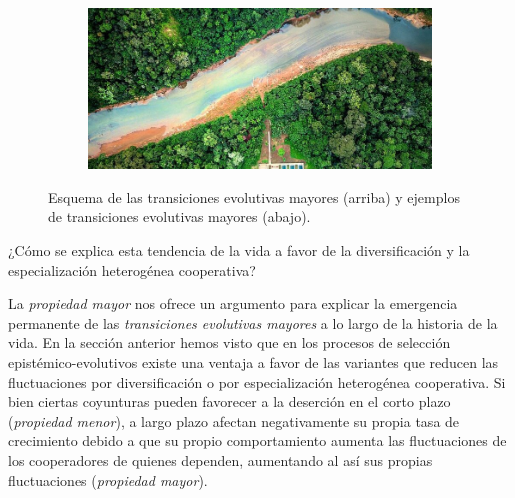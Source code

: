 \documentclass[a4paper,11pt]{book}
\theoremstyle{definition}
\newif\ifen
\newif\ifes
\newcommand{\En}[1]{\ifen#1\fi}
\newcommand{\Es}[1]{\ifes#1\fi}
\begin{document}
\begin{figure}[ht!]
\begin{subfigure}[b]{0.235\textwidth}
 \includegraphics[width=\linewidth]{static/tsimane2.jpg}
  \caption*{\En{Ecosystems}}
 \end{subfigure}
 \caption{
Esquema de las transiciones evolutivas mayores (arriba) y ejemplos de transiciones evolutivas mayores (abajo).
 }
 \label{fig:trans}
 \vspace{-0.3cm}
 \end{figure}
¿Cómo se explica esta tendencia de la vida a favor de la diversificación y la especialización heterogénea cooperativa?


La \emph{propiedad mayor} nos ofrece un argumento para explicar la emergencia permanente de las \emph{transiciones evolutivas mayores} a lo largo de la historia de la vida.
%
En la sección anterior hemos visto que en los procesos de selección epistémico-evolutivos existe una ventaja a favor de las variantes que reducen las fluctuaciones por diversificación o por especialización heterogénea cooperativa.
%
Si bien ciertas coyunturas pueden favorecer a la deserción en el corto plazo (\emph{propiedad menor}), a largo plazo afectan negativamente su propia tasa de crecimiento debido a que su propio comportamiento aumenta las fluctuaciones de los cooperadores de quienes dependen, aumentando al así sus propias fluctuaciones (\emph{propiedad mayor}).


%
%
%
\end{document}

